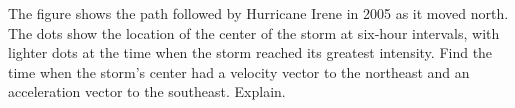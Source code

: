 The figure shows the path followed by Hurricane Irene in 2005 as it moved north. The dots show the
location of the center of the storm at six-hour intervals, with lighter dots at
the time when the storm reached its greatest intensity. Find the time when the
storm's center had a velocity vector to the northeast and an acceleration vector
to the southeast. Explain.
